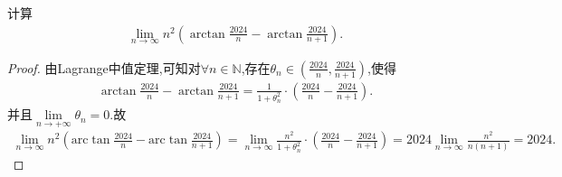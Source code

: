 \documentclass[lang=cn,newtx,10pt,scheme=chinese]{elegantbook}
\begin{document}
\begin{example}
计算
\begin{align*}
\lim_{n \to \infty} n^2 \left(\arctan\frac{2024}{n} - \arctan\frac{2024}{n + 1}\right).
\end{align*}
\end{example}
\begin{proof}
由Lagrange中值定理,可知对$\forall n\in\mathbb{N}$,存在$\theta_n\in(\frac{2024}{n},\frac{2024}{n + 1})$,使得
\begin{align*}
\arctan\frac{2024}{n} - \arctan\frac{2024}{n + 1} = \frac{1}{1+\theta _{n}^{2}}\cdot \left( \frac{2024}{n}-\frac{2024}{n+1} \right).
\end{align*}
并且$\underset{n\rightarrow +\infty}{\lim}\theta _n=0$.故
\begin{align*}
\lim_{n\rightarrow \infty} n^2\left( \mathrm{arc}\tan \frac{2024}{n}-\mathrm{arc}\tan \frac{2024}{n+1} \right) =\lim_{n\rightarrow \infty} \frac{n^2}{1+\theta _{n}^{2}}\cdot \left( \frac{2024}{n}-\frac{2024}{n+1} \right) =2024\lim_{n\rightarrow \infty} \frac{n^2}{n\left( n+1 \right)}=2024.
\end{align*}
\end{proof}
\end{document}
